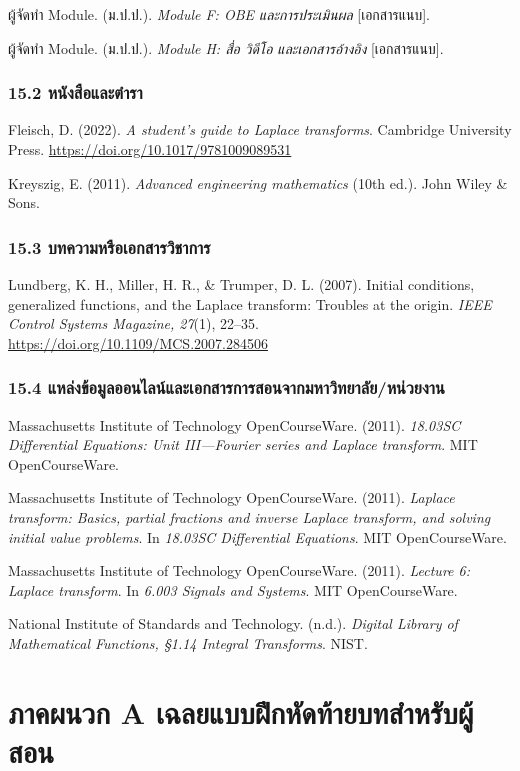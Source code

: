 ผู้จัดทำ Module. (ม.ป.ป.). \textit{Module F: OBE และการประเมินผล} [เอกสารแนบ].

ผู้จัดทำ Module. (ม.ป.ป.). \textit{Module H: สื่อ วิดีโอ และเอกสารอ้างอิง} [เอกสารแนบ].

\subsubsection{15.2 หนังสือและตำรา}

Fleisch, D. (2022). \textit{A student's guide to Laplace transforms}. Cambridge University Press. \url{https://doi.org/10.1017/9781009089531}

Kreyszig, E. (2011). \textit{Advanced engineering mathematics} (10th ed.). John Wiley \& Sons.

\subsubsection{15.3 บทความหรือเอกสารวิชาการ}

Lundberg, K. H., Miller, H. R., \& Trumper, D. L. (2007). Initial conditions, generalized functions, and the Laplace transform: Troubles at the origin. \textit{IEEE Control Systems Magazine, 27}(1), 22–35. \url{https://doi.org/10.1109/MCS.2007.284506}

\subsubsection{15.4 แหล่งข้อมูลออนไลน์และเอกสารการสอนจากมหาวิทยาลัย/หน่วยงาน}

Massachusetts Institute of Technology OpenCourseWare. (2011). \textit{18.03SC Differential Equations: Unit III—Fourier series and Laplace transform}. MIT OpenCourseWare.

Massachusetts Institute of Technology OpenCourseWare. (2011). \textit{Laplace transform: Basics, partial fractions and inverse Laplace transform, and solving initial value problems}. In \textit{18.03SC Differential Equations}. MIT OpenCourseWare.

Massachusetts Institute of Technology OpenCourseWare. (2011). \textit{Lecture 6: Laplace transform}. In \textit{6.003 Signals and Systems}. MIT OpenCourseWare.

National Institute of Standards and Technology. (n.d.). \textit{Digital Library of Mathematical Functions, §1.14 Integral Transforms}. NIST.



\section{ภาคผนวก A เฉลยแบบฝึกหัดท้ายบทสำหรับผู้สอน}

